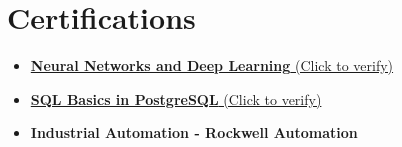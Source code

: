 \documentclass{ExpressiveResume}
\begin{document}

\section{Certifications}
\begin{itemize}
\item {\href{https://www.coursera.org/account/accomplishments/verify/ZRBWP4ZFF8YX}{\textbf{Neural Networks and Deep Learning} (Click to verify)}}
\item {\href{https://learnsql.com/files/course-certificate/dcQdkgNWcDbdVjeWXGwKXFTHqxkLQXbYCCJYexdB}{\textbf{SQL Basics in PostgreSQL} (Click to verify)}}
\item {\textbf{Industrial Automation - Rockwell Automation}}


\end{itemize}
\end{document}
